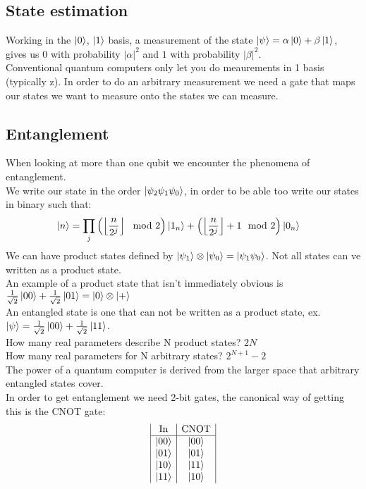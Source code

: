 \subsection{State estimation}
Working in the $\ket{0}$, $\ket{1}$ basis, a measurement of the state $\ket{\psi} = \alpha \ket{0} + \beta \ket{1}$, gives us $0$ with probability $|\alpha|^2$ and $1$ with probability $|\beta|^2$.\\
Conventional quantum computers only let you do meaurements in 1 basis (typically z). In order to do an arbitrary measurement we need a gate that maps our states we want to measure onto the states we can measure.
\subsection{Entanglement}
When looking at more than one qubit we encounter the phenomena of entanglement. \\
We write our state in the order $\ket{\psi_2 \psi_1 \psi_0}$, in order to be able too write our states in binary such that:
\begin{align*}
	\ket{n} &= \prod_j \left(\left\lfloor\frac{n}{2^j}\right\rfloor \mod 2\right)\ket{1_n} + \left(\left\lfloor\frac{n}{2^j}\right\rfloor + 1 \mod 2\right)\ket{0_n}
\end{align*}
We can have product states defined by $\ket{\psi_1}\otimes\ket{\psi_0} = \ket{\psi_1\psi_0}$. Not all states can ve written as a product state. \\
An example of a product state that isn't immediately obvious is $\frac{1}{\sqrt{2}} \ket{00} + \frac{1}{\sqrt{2}} \ket{01} = \ket{0} \otimes \ket{+}$ \\
An entangled state is one that can not be written as a product state, ex. $\ket{\psi} = \frac{1}{\sqrt{2}} \ket{00} + \frac{1}{\sqrt{2}} \ket{11}$. \\
How many real parameters describe N product states? $2N$\\
How many real parameters for N arbitrary states? $2^{N+1} -2$ \\
The power of a quantum computer is derived from the larger space that arbitrary entangled states cover. \\
In order to get entanglement we need 2-bit gates, the canonical way of getting this is the CNOT gate:
\begin{displaymath}
	\begin{array}{|c | c|}
		\text{In} & \text{CNOT} \\
		\hline
		\ket{00} & \ket{00} \\
		\ket{01} & \ket{01} \\
		\ket{10} & \ket{11} \\
		\ket{11} & \ket{10}
       \end{array}
\end{displaymath}
